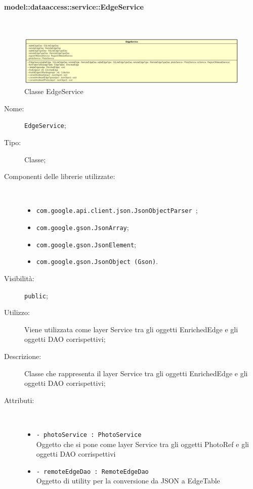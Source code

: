 \documentclass[../DefinizioneDiProdotto.tex]{subfiles}
\begin{document}
\paragraph{model::dataaccess::service::EdgeService}
\
\begin{figure}[H]
	\centering
	\includegraphics[width=\maxwidth]{img/EdgeService.png}
	\caption{Classe EdgeService}\label{fig:model::dataaccess::service::EdgeService} 
\end{figure}
\begin{description}
	\item[Nome:] \texttt{EdgeService};
	\item[Tipo:] Classe;
	\item[Componenti delle librerie utilizzate:] \
	\begin{itemize}
		\item \texttt{com.google.api.client.json.JsonObjectParser
		};
		
		\item \texttt{com.google.gson.JsonArray};
		
		\item \texttt{com.google.gson.JsonElement};
		
		\item \texttt{com.google.gson.JsonObject (Gson)}.
		
	\end{itemize}
	\item[Visibilità:] \texttt{public};
	\item[Utilizzo:] Viene utilizzata come layer Service tra gli oggetti EnrichedEdge e gli oggetti DAO corrispettivi;
	\item[Descrizione:] Classe che rappresenta il layer Service tra gli oggetti EnrichedEdge e gli oggetti DAO corrispettivi;
	\item[Attributi:] \
	\begin{itemize}
		\item \texttt{- photoService : PhotoService}\\
		Oggetto che si pone come layer Service tra gli oggetti PhotoRef e gli oggetti DAO corrispettivi
		
		\item \texttt{- remoteEdgeDao : RemoteEdgeDao}\\
		Oggetto di utility per la conversione da JSON a EdgeTable
		

\end{itemize}
\end{description}
\end{document}

